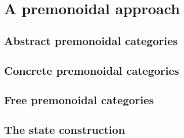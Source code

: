 
\section{A premonoidal approach} \label{section:premonoidal}

\subsection{Abstract premonoidal categories}

\subsection{Concrete premonoidal categories}

\subsection{Free premonoidal categories}

\subsection{The state construction}
